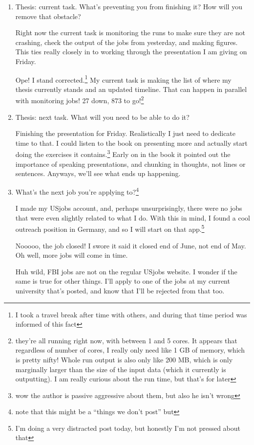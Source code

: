 \documentclass[12pt]{article}
\newcommand{\say}[1]{``#1''}
\renewcommand{\,}{\textsuperscript{,}}
\begin{document}
\begin{enumerate}
\item Thesis: current task. What's preventing you from finishing it? How will you remove that obstacle?

Right now the current task is monitoring the runs to make sure they are not crashing, check the output of the jobs from yesterday, and making figures.  
This ties really closely in to working through the presentation I am giving on Friday.

Ope! I stand corrected.\footnote{I took a travel break after time with others, and during that time period was informed of this fact} My current task is making the list of where my thesis currently stands and an updated timeline.  
That can happen in parallel with monitoring jobs! 27 down, 873 to go!\footnote{they're all running right now, with between 1 and 5 cores. It appears that regardless of number of cores, I really only need like 1 GB of memory, which is pretty nifty! Whole run output is also only like 200 MB, which is only marginally larger than the size of the input data (which it currently is outputting). I am really curious about the run time, but that's for later}

\item Thesis: next task. What will you need to be able to do it?

Finishing the presentation for Friday. Realistically I just need to dedicate time to that.  
I could listen to the book on presenting more and actually start doing the exercises it contains.\footnote{wow the author is passive aggressive about them, but also he isn't wrong}  
Early on in the book it pointed out the importance of speaking presentations, and chunking in thoughts, not lines or sentences.  
Anyways, we'll see what ends up happening.

\item What's the next job you're applying to?\footnote{note that this might be a \say{things we don't post} but}

I made my USjobs account, and, perhaps unsurprisingly, there were no jobs that were even slightly related to what I do.  
With this in mind, I found a cool outreach position in Germany, and so I will start on that app.\footnote{I'm doing a very distracted post today, but honestly I'm not pressed about that}

Nooooo, the job closed! I swore it said it closed end of June, not end of May.  
Oh well, more jobs will come in time.

Huh wild, FBI jobs are not on the regular USjobs website. I wonder if the same is true for other things.  
I'll apply to one of the jobs at my current university that's posted, and know that I'll be rejected from that too.


\end{enumerate}
\end{document}
